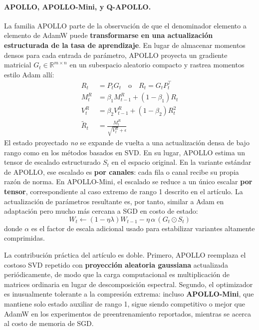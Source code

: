 \documentclass[11pt,a4paper]{article}
\begin{document}
\paragraph{APOLLO, APOLLO-Mini, y Q-APOLLO.}
La familia APOLLO \citep{zhu2025apollosgdlikememoryadamwlevel} parte de la observación de que el denominador elemento a elemento de AdamW puede \textbf{transformarse en una actualización estructurada de la tasa de aprendizaje}. En lugar de almacenar momentos densos para cada entrada de parámetro, APOLLO proyecta un gradiente matricial $G_t \in \mathbb{R}^{m \times n}$ en un subespacio aleatorio compacto y rastrea momentos estilo Adam allí:
\begin{align}
R_t &= P_t G_t \quad\text{o}\quad R_t = G_t P_t^\top \\
M_t^R &= \beta_1 M_{t-1}^R + (1-\beta_1)R_t \\
V_t^R &= \beta_2 V_{t-1}^R + (1-\beta_2)R_t^2 \\
\widetilde{R}_t &= \frac{M_t^R}{\sqrt{V_t^R}+\epsilon}
\end{align}
El estado proyectado \emph{no} se expande de vuelta a una actualización densa de bajo rango como en los métodos basados en SVD. En su lugar, APOLLO estima un tensor de escalado estructurado $S_t$ en el espacio original. En la variante estándar de APOLLO, ese escalado es \textbf{por canales}: cada fila o canal recibe su propia razón de norma. En APOLLO-Mini, el escalado se reduce a un único escalar \textbf{por tensor}, correspondiente al caso extremo de rango 1 descrito en el artículo. La actualización de parámetros resultante es, por tanto, similar a Adam en adaptación pero mucho más cercana a SGD en costo de estado:
\[
W_t \gets (1-\eta\lambda)W_{t-1} - \eta\,\alpha\,(G_t \odot S_t)
\]
donde $\alpha$ es el factor de escala adicional usado para estabilizar variantes altamente comprimidas.

La contribución práctica del artículo es doble. Primero, APOLLO reemplaza el costoso SVD repetido con \textbf{proyección aleatoria gaussiana} actualizada periódicamente, de modo que la carga computacional es multiplicación de matrices ordinaria en lugar de descomposición espectral. Segundo, el optimizador es inusualmente tolerante a la compresión extrema: incluso \textbf{APOLLO-Mini}, que mantiene solo estado auxiliar de rango 1, sigue siendo competitivo o mejor que AdamW en los experimentos de preentrenamiento reportados, mientras se acerca al costo de memoria de SGD.
\end{document}
